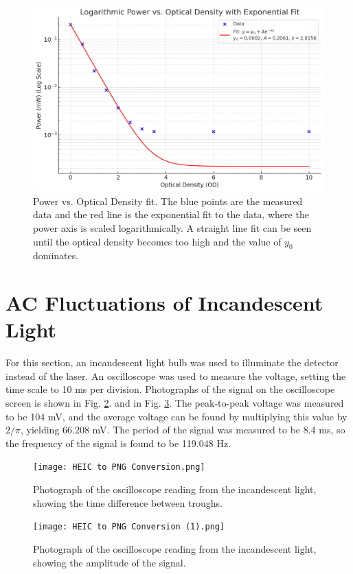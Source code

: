 \documentclass[12pt]{article}
\begin{document}
\begin{figure} [H]
    \centering
    \includegraphics[width=0.8\linewidth]{Output from ChatGPT (2).png}
    \caption{Power vs. Optical Density fit. The blue points are the measured data and the red line is the exponential fit to the data, where the power axis is scaled logarithmically. A straight line fit can be seen until the optical density becomes too high and the value of \(y_0\) dominates.}
    \label{fig:log-fit}
\end{figure}

\section*{AC Fluctuations of Incandescent Light}
For this section, an incandescent light bulb was used to illuminate the detector instead of the laser. An oscilloscope was used to measure the voltage, setting the time scale to 10 ms per division. Photographs of the signal on the oscilloscope screen is shown in Fig. \ref{fig:oscilloscope}. and in Fig. \ref{fig:oscilloscope1}. The peak-to-peak voltage was measured to be 104 mV, and the average voltage can be found by multiplying this value by \(2 / \pi\), yielding 66.208 mV. The period of the signal was measured to be 8.4 ms, so the frequency of the signal is found to be 119.048 Hz.

\begin{figure} [H]
    \centering
    \texttt{[image: HEIC to PNG Conversion.png]}
    \caption{Photograph of the oscilloscope reading from the incandescent light, showing the time difference between troughs.}
    \label{fig:oscilloscope}
\end{figure}

\begin{figure} [H]
    \centering
    \texttt{[image: HEIC to PNG Conversion (1).png]}
    \caption{Photograph of the oscilloscope reading from the incandescent light, showing the amplitude of the signal.}
    \label{fig:oscilloscope1}
\end{figure}
\end{document}
